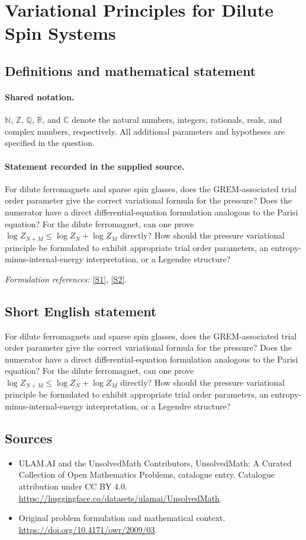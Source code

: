 \documentclass[11pt]{article}
\newcommand{\sref}[2]{\hyperlink{source:#1:#2}{[S#2]}}
\begin{document}
\section{Variational Principles for Dilute Spin Systems}\label{statement}

\subsection{Definitions and mathematical statement}

\paragraph{Shared notation.}$\mathbb N$, $\mathbb Z$, $\mathbb Q$, $\mathbb R$, and $\mathbb C$ denote the natural numbers, integers, rationals, reals, and complex numbers, respectively. All additional parameters and hypotheses are specified in the question.


\paragraph{Statement recorded in the supplied source.}
For dilute ferromagnets and sparse spin glasses, does the GREM-associated trial order parameter give the correct variational formula for the pressure? Does the numerator have a direct differential-equation formulation analogous to the Parisi equation? For the dilute ferromagnet, can one prove $\log Z_{N+M}\leq\log Z_N+\log Z_M$ directly? How should the pressure variational principle be formulated to exhibit appropriate trial order parameters, an entropy-minus-internal-energy interpretation, or a Legendre structure?
\par\smallskip\textit{Formulation references:} \sref{statement}{1}, \sref{statement}{2}.
\subsection{Short English statement}
For dilute ferromagnets and sparse spin glasses, does the GREM-associated trial order parameter give the correct variational formula for the pressure? Does the numerator have a direct differential-equation formulation analogous to the Parisi equation? For the dilute ferromagnet, can one prove $\log Z_{N+M}\leq\log Z_N+\log Z_M$ directly? How should the pressure variational principle be formulated to exhibit appropriate trial order parameters, an entropy-minus-internal-energy interpretation, or a Legendre structure?
\subsection{Sources}
\begin{itemize}
\item[\hypertarget{source:statement:1}{S1}] ULAM.AI and the UnsolvedMath Contributors, UnsolvedMath: A Curated Collection of Open Mathematics Problems, catalogue entry. Catalogue attribution under CC BY 4.0.
\url{https://huggingface.co/datasets/ulamai/UnsolvedMath}.
\item[\hypertarget{source:statement:2}{S2}] Original problem formulation and mathematical context.
\url{https://doi.org/10.4171/owr/2009/03}.
\end{itemize}
\label{end:statement}
\end{document}
